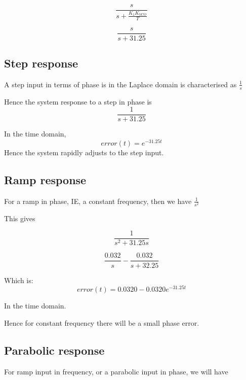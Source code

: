 \begin{equation}
\frac{s}{s+\frac{K_1 K_{VCO}}{T}}
\end{equation}

\begin{equation}
\frac{s}{s+31.25}
\end{equation}

\subsection{Step response}
A step input in terms of phase is in the Laplace domain is characterised as  $\frac{1}{s}$

Hence the system response to a step in phase is
\begin{equation}
\frac{1}{s+31.25}
\end{equation}


In the time domain,
\begin{equation}
 error(t) =  e^{-31.25t}
\end{equation}
Hence the system rapidly adjusts to the step input. 

\subsection{Ramp response}

For a ramp in phase, IE, a constant frequency, then we have $\frac{1}{s^2}$

This gives 

\begin{equation}
\frac{1}{s^2+31.25s}
\end{equation}


\begin{equation}
\frac{0.032}{s} - \frac{0.032}{s+32.25} 
\end{equation}



Which is: 
\begin{equation}
error(t) =  0.0320 -0.0320e^{-31.25t}
\end{equation}

In the time domain.

Hence for constant frequency there will be a small phase error.

\subsection{Parabolic response}
For ramp input in frequency, or a parabolic input in phase, we will have 


